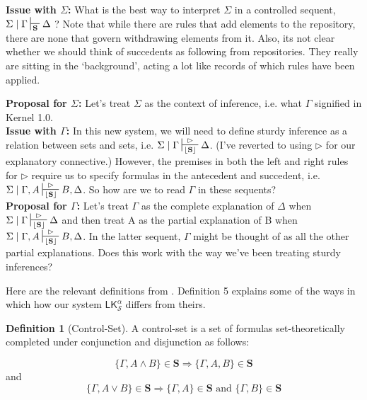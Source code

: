 \documentclass{article}                     %
\theoremstyle{theorem}
\theoremstyle{corollary}
\theoremstyle{lemma}
\theoremstyle{definition}
\newtheorem{definition}[section]{Definition}
\theoremstyle{remark}
\theoremstyle{definition}
\theoremstyle{notation}
\theoremstyle{definition}
\theoremstyle{proposition}
\theoremstyle{definition}
\begin{document}
\begin{framed}

\noindent\textbf{Issue with $ \Sigma $:}
What is the best way to interpret $ \Sigma $ in a controlled sequent, $\Sigma\mid\Gamma\sststile{\mathbf{S}}{}\Delta $ ? Note that while there are rules that add elements to the repository, there are none that govern withdrawing elements from it. Also, its not clear whether we should think of succedents as following from repositories. They really are sitting in the `background', acting a lot like records of which rules have been applied.

\textbf{Proposal for $ \Sigma $:} Let's treat $ \Sigma $ as the context of inference, i.e. what $ \Gamma $ signified in Kernel 1.0.\\

\noindent\textbf{Issue with $ \Gamma $:} In this new system, we will need to define sturdy inference as a relation between sets and sets, i.e. $ \Sigma\mid\Gamma\sststile{\mathbf{\lfloor\mathbf{S}\rfloor}}{\rhd} \Delta $. (I've reverted to using $ \rhd $ for our explanatory connective.) However, the premises in both the left and right rules for $ \rhd $ require us to specify formulas in the antecedent and succedent, i.e. $ \Sigma\mid\Gamma, A\sststile{\mathbf{\lfloor\mathbf{S}\rfloor}}{\rhd} B, \Delta $. So how are we to read $ \Gamma  $ in these sequents?\\

\textbf{Proposal for $ \Gamma $:} Let's treat $ \Gamma $ as the complete explanation of $ \Delta $ when $ \Sigma\mid\Gamma\sststile{\mathbf{\lfloor\mathbf{S}\rfloor}}{\rhd} \Delta $ and then treat A as the partial explanation of B when $ \Sigma\mid\Gamma, A\sststile{\mathbf{\lfloor\mathbf{S}\rfloor}}{\rhd} B, \Delta $. In the latter sequent, $ \Gamma $ might be thought of as all the other partial explanations. Does this work with the way we've been treating sturdy inferences?

\end{framed}




\vspace{3mm}

Here are the relevant definitions from \textcite{Piazza2015}. Definition 5 explains some of the ways in which how our system $\mathsf{LK}^\alpha_\mathcal{S} $ differs from theirs.


\begin{definition}[Control-Set]
A control-set is a set of formulas set-theoretically completed under conjunction and disjunction as follows:

$$ \{\Gamma, A \wedge B\} \in \mathbf{S} \Rightarrow \{\Gamma, A, B\} \in \mathbf{S}$$ and
$$\{\Gamma, A \vee B\} \in \mathbf{S} \Rightarrow \{\Gamma, A\} \in \mathbf{S} \,\,\mathrm{and}\,\, \{\Gamma, B\} \in \mathbf{S}$$
\end{definition}
\end{document}

